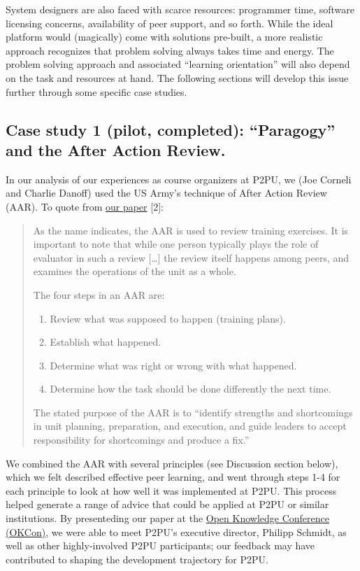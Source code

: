 System designers are also faced with scarce resources: programmer time,
software licensing concerns, availability of peer support, and so forth.
While the ideal platform would (magically) come with solutions
pre-built, a more realistic approach recognizes that problem solving
always takes time and energy. The problem solving approach and
associated ``learning orientation'' will also depend on the task and
resources at hand. The following sections will develop this issue
further through some specific case studies.

\subsection{Case study 1 (pilot, completed): ``Paragogy'' and the After
Action Review.}

In our analysis of our experiences as course organizers at P2PU, we (Joe
Corneli and Charlie Danoff) used the US Army's technique of After Action
Review (AAR). To quote from
\href{http://paragogy.net/ParagogyPaper2}{our paper} {[}2{]}:

\begin{quote}
As the name indicates, the AAR is used to review training exercises. It
is important to note that while one person typically plays the role of
evaluator in such a review {[}\ldots{}{]} the review itself happens
among peers, and examines the operations of the unit as a whole.

The four steps in an AAR are:

\begin{enumerate}
\item
  Review what was supposed to happen (training plans).
\item
  Establish what happened.
\item
  Determine what was right or wrong with what happened.
\item
  Determine how the task should be done differently the next time.
\end{enumerate}
The stated purpose of the AAR is to ``identify strengths and
shortcomings in unit planning, preparation, and execution, and guide
leaders to accept responsibility for shortcomings and produce a fix.''

\end{quote}
We combined the AAR with several principles (see Discussion section
below), which we felt described effective peer learning, and went
through steps 1-4 for each principle to look at how well it was
implemented at P2PU. This process helped generate a range of advice that
could be applied at P2PU or similar institutions. By presenteding our
paper at the \href{http://okfn.org/okcon/}{Open Knowledge Conference
(OKCon)}, we were able to meet P2PU's executive director, Philipp
Schmidt, as well as other highly-involved P2PU participants; our
feedback may have contributed to shaping the development trajectory for
P2PU.

